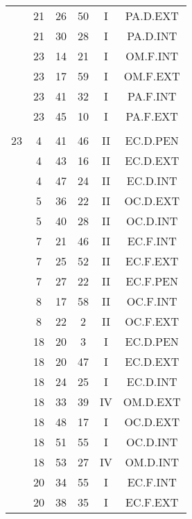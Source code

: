 \documentclass[12pt, a4paper]{article}
\begin{document}
\begin{multicols}{3}
{\begin{tabular}{c c c c c c}
	 	 	 	 & 21 & 26 & 50 & I & PA.D.EXT\\%
	 	 	 	 & 21 & 30 & 28 & I & PA.D.INT\\%
	 	 	 	 & 23 & 14 & 21 & I & OM.F.INT\\%
	 	 	 	 & 23 & 17 & 59 & I & OM.F.EXT\\%
	 	 	 	 & 23 & 41 & 32 & I & PA.F.INT\\%
	 	 	 	 & 23 & 45 & 10 & I & PA.F.EXT\\%
	 	 	 	 & & & & & \\%
	 	 	 	23 & 4 & 41 & 46 & II & EC.D.PEN\\%
	 	 	 	 & 4 & 43 & 16 & II & EC.D.EXT\\%
	 	 	 	 & 4 & 47 & 24 & II & EC.D.INT\\%
	 	 	 	 & 5 & 36 & 22 & II & OC.D.EXT\\%
	 	 	 	 & 5 & 40 & 28 & II & OC.D.INT\\%
	 	 	 	 & 7 & 21 & 46 & II & EC.F.INT\\%
	 	 	 	 & 7 & 25 & 52 & II & EC.F.EXT\\%
	 	 	 	 & 7 & 27 & 22 & II & EC.F.PEN\\%
	 	 	 	 & 8 & 17 & 58 & II & OC.F.INT\\%
	 	 	 	 & 8 & 22 & 2 & II & OC.F.EXT\\%
	 	 	 	 & 18 & 20 & 3 & I & EC.D.PEN\\%
	 	 	 	 & 18 & 20 & 47 & I & EC.D.EXT\\%
	 	 	 	 & 18 & 24 & 25 & I & EC.D.INT\\%
	 	 	 	 & 18 & 33 & 39 & IV & OM.D.EXT\\%
	 	 	 	 & 18 & 48 & 17 & I & OC.D.EXT\\%
	 	 	 	 & 18 & 51 & 55 & I & OC.D.INT\\%
	 	 	 	 & 18 & 53 & 27 & IV & OM.D.INT\\%
	 	 	 	 & 20 & 34 & 55 & I & EC.F.INT\\%
	 	 	 	 & 20 & 38 & 35 & I & EC.F.EXT\\%
	 	 \end{tabular}
 	}
\end{multicols}
\end{document}
